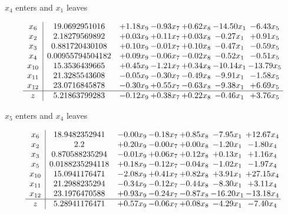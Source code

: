 \documentclass[8pt]{article}
\begin{document}
 $ x_{4} $ enters and $ x_{1} $ leaves 

 \[\begin{array}{c| c c@{\hskip 2pt} c@{\hskip 2pt} c@{\hskip 2pt} c@{\hskip 2pt} c@{\hskip 2pt} }
 x_{6}   &  19.0692951016 & +  1.18 x_{9} & -0.93 x_{7} & +  0.62 x_{8} & -14.50 x_{1} & -6.43 x_{5}\\
 x_{2}   &  2.18279569892 & +  0.03 x_{9} & +  0.11 x_{7} & +  0.03 x_{8} & -0.27 x_{1} & +  0.91 x_{5}\\
 x_{3}   &  0.881720430108 & +  0.10 x_{9} & -0.01 x_{7} & +  0.10 x_{8} & -0.47 x_{1} & -0.59 x_{5}\\
 x_{4}   &  0.00955794504182 & +  0.09 x_{9} & -0.06 x_{7} & -0.02 x_{8} & -0.52 x_{1} & -0.51 x_{5}\\
 x_{10}   &  15.3536439665 & +  0.45 x_{9} & -1.21 x_{7} & +  0.34 x_{8} & -10.14 x_{1} & -13.79 x_{5}\\
 x_{11}   &  21.3285543608 & -0.05 x_{9} & -0.30 x_{7} & -0.49 x_{8} & -9.91 x_{1} & -1.58 x_{5}\\
 x_{12}   &  23.0716845878 & -0.30 x_{9} & +  0.55 x_{7} & -0.63 x_{8} & -9.38 x_{1} & +  6.69 x_{5}\\
\hline
z    &  5.21863799283 & -0.12 x_{9} & +  0.38 x_{7} & +  0.22 x_{8} & -0.46 x_{1} & +  3.76 x_{5}\\
\end{array}\]


 $ x_{5} $ enters and $ x_{4} $ leaves 

 \[\begin{array}{c| c c@{\hskip 2pt} c@{\hskip 2pt} c@{\hskip 2pt} c@{\hskip 2pt} c@{\hskip 2pt} }
 x_{6}   &  18.9482352941 & -0.00 x_{9} & -0.18 x_{7} & +  0.85 x_{8} & -7.95 x_{1} & + 12.67 x_{4}\\
 x_{2}   &  2.2 & +  0.20 x_{9} & -0.00 x_{7} & +  0.00 x_{8} & -1.20 x_{1} & -1.80 x_{4}\\
 x_{3}   &  0.870588235294 & -0.01 x_{9} & +  0.06 x_{7} & +  0.12 x_{8} & +  0.13 x_{1} & +  1.16 x_{4}\\
 x_{5}   &  0.0188235294118 & +  0.18 x_{9} & -0.12 x_{7} & -0.04 x_{8} & -1.02 x_{1} & -1.97 x_{4}\\
 x_{10}   &  15.0941176471 & -2.08 x_{9} & +  0.41 x_{7} & +  0.82 x_{8} & +  3.91 x_{1} & + 27.15 x_{4}\\
 x_{11}   &  21.2988235294 & -0.34 x_{9} & -0.12 x_{7} & -0.44 x_{8} & -8.30 x_{1} & +  3.11 x_{4}\\
 x_{12}   &  23.1976470588 & +  0.93 x_{9} & -0.24 x_{7} & -0.87 x_{8} & -16.20 x_{1} & -13.18 x_{4}\\
\hline
z    &  5.28941176471 & +  0.57 x_{9} & -0.06 x_{7} & +  0.08 x_{8} & -4.29 x_{1} & -7.40 x_{4}\\
\end{array}\]
\end{document}
